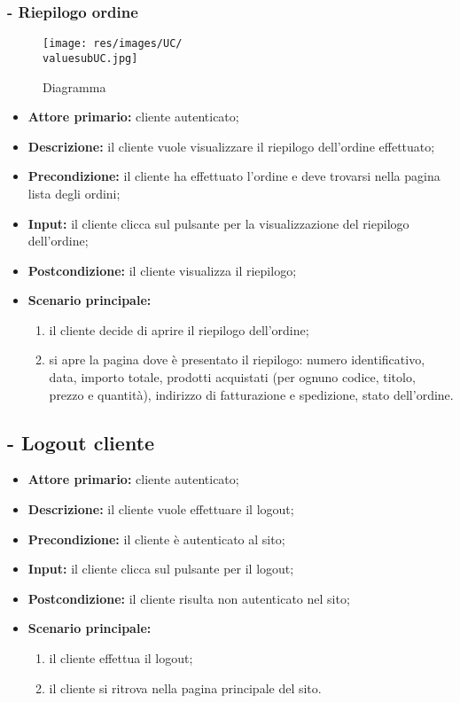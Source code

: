 \stepsubUserCase
\subsubsection{ - Riepilogo ordine}
\begin{figure}[H]
    \centering
    \texttt{[image: res/images/UC/\\valuesubUC.jpg]}
    \caption{Diagramma }
\end{figure}
\begin{itemize}
    \item \textbf{Attore primario:} cliente autenticato;
    \item \textbf{Descrizione:} il cliente vuole visualizzare il riepilogo dell'ordine effettuato;
    \item \textbf{Precondizione:} il cliente ha effettuato l'ordine e deve trovarsi nella pagina lista degli ordini;
    \item \textbf{Input:} il cliente clicca sul pulsante per la visualizzazione del riepilogo dell'ordine;
    \item \textbf{Postcondizione:} il cliente visualizza il riepilogo;
    \item \textbf{Scenario principale:}
          \begin{enumerate}
              \item il cliente decide di aprire il riepilogo dell'ordine;
              \item si apre la pagina dove è presentato il riepilogo: numero identificativo, data, importo totale, prodotti acquistati (per ognuno codice, titolo, prezzo e quantità), indirizzo di fatturazione e spedizione, stato dell'ordine.
          \end{enumerate}
\end{itemize}

\stepUserCase
\subsection{ - Logout cliente}
\begin{itemize}
    \item \textbf{Attore primario:} cliente autenticato;
    \item \textbf{Descrizione:} il cliente vuole effettuare il logout;
    \item \textbf{Precondizione:} il cliente è autenticato al sito;
    \item \textbf{Input:} il cliente clicca sul pulsante per il logout;
    \item \textbf{Postcondizione:} il cliente risulta non autenticato nel sito;
    \item \textbf{Scenario principale:}
          \begin{enumerate}
              \item il cliente effettua il logout;
              \item il cliente si ritrova nella pagina principale del sito.
          \end{enumerate}
\end{itemize}

